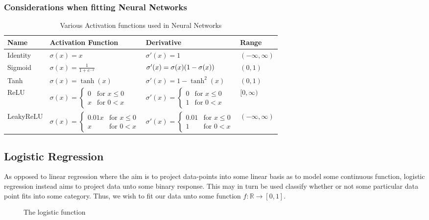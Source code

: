 \documentclass[reprint, english, nofootinbib]{revtex4-2}
\begin{document}
\subsubsection{Considerations when fitting Neural Networks}


\begin{table*}[]
\caption{\label{tab: activation functions}Various Activation functions used in Neural Networks}
\setlength{\tabcolsep}{20pt}
\renewcommand{\arraystretch}{2.5}
\begin{tabular}{llll}
    Name & Activation Function & Derivative & Range \\
    \hline\hline
    Identity &
    $\sigma(x) = x$  &
    $\sigma'(x) = 1$ &
    $(-\infty, \infty)$
    \\ \hline
    Sigmoid &
    $\sigma(x) = \frac{1}{1 + e^{-x}}$  &
    $\sigma'(x) =\sigma(x)\qty(1-\sigma(x))$ &
    $(0, 1)$
    \\ \hline
    Tanh &
    $\sigma(x) = \tanh(x)$  &
    $\sigma'(x) =  1 - \tanh^2(x)$ &
    $(0, 1)$
    \\ \hline
    ReLU    &
    $\sigma(x) = \left\{\begin{matrix}0 & \text{for } x \leq 0 \\ x & \text{for } 0 < x\end{matrix}\right.$ &
    $\sigma'(x) = \left\{\begin{matrix}0 & \text{for } x \leq 0 \\ 1 & \text{for } 0 < x\end{matrix}\right.$ &
    $[0, \infty)$
    \\ \hline
    LeakyReLU &
    $\sigma(x) = \left\{\begin{matrix}0.01x & \text{for } x \leq 0 \\ x & \text{for } 0 < x\end{matrix}\right.$ &
    $\sigma'(x) = \left\{\begin{matrix}0.01 & \text{for } x \leq 0 \\ 1 & \text{for } 0 < x\end{matrix}\right.$ &
    $(-\infty, \infty)$
    \\ \hline
\end{tabular}
\end{table*}



\subsection{Logistic Regression}
\noindent
As opposed to linear regression where the aim is to project data-points into some linear basis as to model some continuous function, logistic regression instead aims to project data unto some binary response. This may in turn be used classify whether or not some particular data point fits into some category. Thus, we wish to fit our data unto some function $f : \mathbb R \rightarrow [0, 1]$.
\begin{figure}[h!tb]
    \center
    
    \caption{The logistic function}
\end{figure}
\end{document}
